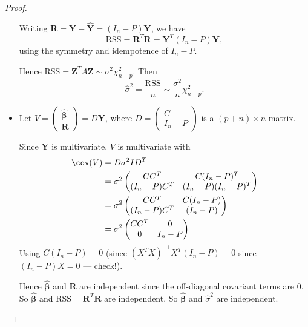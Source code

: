 \documentclass[a4paper]{article}
\begin{document}
\begin{proof}
\begin{itemize}
      Writing $\mathbf{R} = \mathbf{Y} - \hat{\mathbf{Y}} = (I_n - P)\mathbf{Y}$, we have
      \[
        \mathrm{RSS} = \mathbf{R}^T\mathbf{R} = \mathbf{Y}^T(I_n - P)\mathbf{Y},
      \]
      using the symmetry and idempotence of $I_n - P$.

      Hence $\mathrm{RSS} = \mathbf{Z}^TA\mathbf{Z} \sim \sigma^2\chi^2_{n - p}$. Then
      \[
        \hat{\sigma}^2 = \frac{\mathrm{RSS}}{n}\sim \frac{\sigma^2}{n}\chi^2_{n- p}.
      \]
    \item Let $V = \begin{pmatrix}\hat{\boldsymbol\beta}\\\mathbf{R}\end{pmatrix} = D\mathbf{Y}$, where $D = \begin{pmatrix}C\\I_n - P\end{pmatrix}$ is a $(p + n)\times n$ matrix.

      Since $\mathbf{Y}$ is multivariate, $V$ is multivariate with
      \begin{align*}
        \cov (V) &= D\sigma^2ID^T\\
        &= \sigma^2
        \begin{pmatrix}
          CC^T & C(I_n - P)^T\\
          (I_n - P)C^T & (I_n - P)(I_n - P)^T
        \end{pmatrix}\\
        &=
        \sigma^2
        \begin{pmatrix}
          CC^T & C(I_n - P)\\
          (I_n - P)C^T & (I_n - P)
        \end{pmatrix}\\
        &= \sigma^2
        \begin{pmatrix}
          CC^T & 0\\
          0 & I_n - P
        \end{pmatrix}
      \end{align*}
      Using $C(I_n - P) = 0$ (since $(X^TX)^{-1}X^T(I_n - P) = 0$ since $(I_n - P)X = 0$ --- check!).

      Hence $\hat{\boldsymbol\beta}$ and $\mathbf{R}$ are independent since the off-diagonal covariant terms are 0. So $\hat{\boldsymbol\beta}$ and $\mathrm{RSS}=\mathbf{R}^T\mathbf{R}$ are independent. So $\hat{\boldsymbol\beta}$ and $\hat{\sigma}^2$ are independent.\qedhere
  \end{itemize}
\end{proof}
\end{document}
